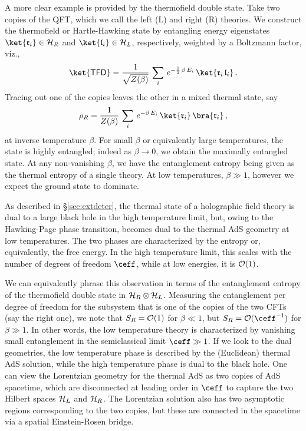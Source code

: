 \documentclass[12pt,openany]{book}
\begin{document}
A more clear example is provided by the thermofield double state. Take two copies of the QFT, which we call the left (L) and right (R) theories. We construct the thermofield or Hartle-Hawking state by entangling energy eigenstates  $\ket{\mathfrak{r}_i} \in {\cal H}_R$ and $\ket{\mathfrak{l}_i} \in {\cal H}_L$, respectively, weighted by a Boltzmann factor, viz.,
%
$$ \ket{{\sf TFD}} = \frac{1}{\sqrt{Z(\beta)}} \, \sum_i \, e^{-\frac{1}{2}\,\beta\, E_i}\,
\ket{\mathfrak{r}_i\, \mathfrak{l}_i}\,.$$
%
 Tracing out one of the copies  leaves the other in a mixed thermal state, say
  $$\rho_R = \frac{1}{Z(\beta)}\, \sum_i \, e^{-\beta\, E_i} \, \ket{\mathfrak{r}_i} \, \bra{\mathfrak{r}_i} \,,$$
%
  at inverse temperature $\beta$. For small $\beta$ or equivalently large temperatures, the state is highly entangled; indeed as $\beta \to 0$, we obtain the maximally entangled state. At any non-vanishing $\beta$, we have the entanglement entropy being given as the thermal entropy of a single theory. At low temperatures, $\beta \gg 1$, however we expect the ground state to dominate.

As described in \S\ref{sec:extdeter}, the thermal state of a holographic field theory is dual to a large \SAdS{} black hole in the high temperature limit, but, owing to the Hawking-Page phase transition, becomes dual to the thermal AdS geometry at low temperatures. The two phases are characterized by the entropy or, equivalently, the free energy. In the high temperature limit, this scales with the number of degrees of freedom $\ceff$, while at low energies, it is
${\cal O}(1)$.

We can equivalently phrase this observation in terms of the entanglement entropy of the thermofield double state in ${\cal H}_R \otimes {\cal H}_L$. Measuring the entanglement per degree of freedom for the subsystem that is one of the copies of the two CFTs (say the right one), we note that $S_R = {\cal O}(1)$ for $\beta \ll 1$, but $S_R = {\cal O}(\ceff^{-1})$ for $\beta \gg 1 $. In other words, the low temperature theory is characterized by vanishing small entanglement in the semiclassical limit $\ceff \gg 1$. If we look to the dual geometries, the low temperature phase is described by the (Euclidean) thermal AdS solution, while the high temperature phase is dual to the \SAdS{} black hole. One can view the Lorentzian geometry for the thermal AdS as two copies of AdS spacetime, which are disconnected at leading order in $\ceff$ to capture the two Hilbert spaces ${\cal H}_L $ and ${\cal H}_R$.
The Lorentzian \SAdS{}  solution  also has two asymptotic regions corresponding to the two copies, but these are connected in the spacetime via a spatial Einstein-Rosen bridge.
\end{document}
